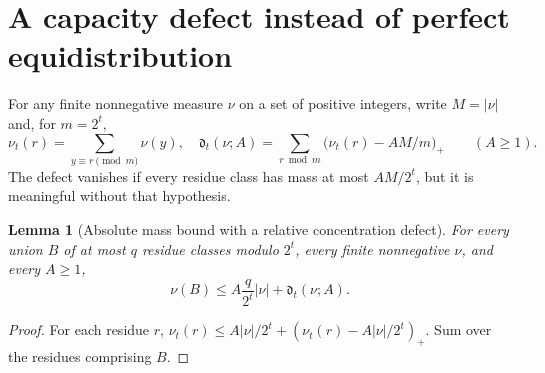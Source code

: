 \documentclass[11pt,a4paper]{article}
\newtheorem{lemma}[theorem]{Lemma}
\begin{document}
\section{A capacity defect instead of perfect equidistribution}
For any finite nonnegative measure $\nu$ on a set of positive integers, write $M=|\nu|$ and, for $m=2^t$,
\[
 \nu_t(r)=\sum_{y\equiv r\pmod m}\nu(y),\quad
 \mathfrak d_t(\nu;A)=\sum_{r\bmod m}\bigl(\nu_t(r)-A M/m\bigr)_+\qquad(A\ge1).
\]
The defect vanishes if every residue class has mass at most $A M/2^t$, but it is meaningful without that hypothesis.

\begin{lemma}[Absolute mass bound with a relative concentration defect]\label{lem:capacity}
For every union $B$ of at most $q$ residue classes modulo $2^t$, every finite nonnegative $\nu$, and every $A\ge1$,
\begin{equation}\label{eq:cap}
 \nu(B)\le A\frac{q}{2^t}|\nu|+\mathfrak d_t(\nu;A).
\end{equation}
\end{lemma}
\begin{proof}
For each residue $r$, $\nu_t(r)\le A|\nu|/2^t+(\nu_t(r)-A|\nu|/2^t)_+$. Sum over the residues comprising $B$.
\end{proof}
\end{document}
